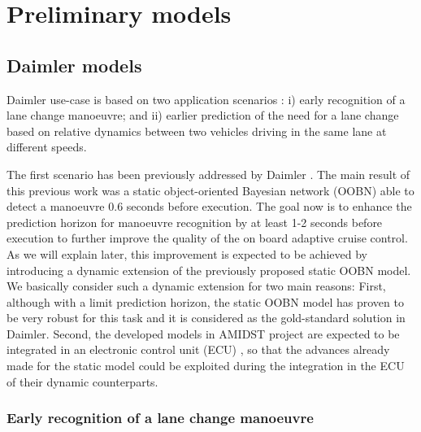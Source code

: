 \section{Preliminary models}
\subsection{Daimler models}


Daimler use-case is based on two application scenarios \cite{Fer14}: i) early recognition of a lane change manoeuvre; and ii) earlier prediction of the need for a lane change based on relative dynamics between two vehicles driving in the same lane at different speeds. 

The first scenario has been previously addressed by Daimler \cite{kasper2012object}. The main result of this previous work was a static object-oriented Bayesian network (OOBN) \cite{koller1997object} able to detect a manoeuvre 0.6 seconds before execution. The goal now is to enhance the prediction horizon for manoeuvre recognition by at least 1-2 seconds before execution to further improve the quality of the on board adaptive cruise control. As we will explain later, this improvement is expected to be achieved by introducing a dynamic extension of the previously proposed static OOBN model. We basically consider such a dynamic extension for two main reasons: First, although with a limit prediction horizon, the static OOBN model has proven to be very robust for this task and it is considered as the gold-standard solution in Daimler. Second, the developed models in AMIDST project are expected to be integrated in an electronic control unit (ECU) \cite{Fer14}, so that the advances already made for the static model \cite{Weidl2014} could be exploited during the integration in the ECU of their dynamic counterparts. 

\subsubsection{Early recognition of a lane change manoeuvre}

